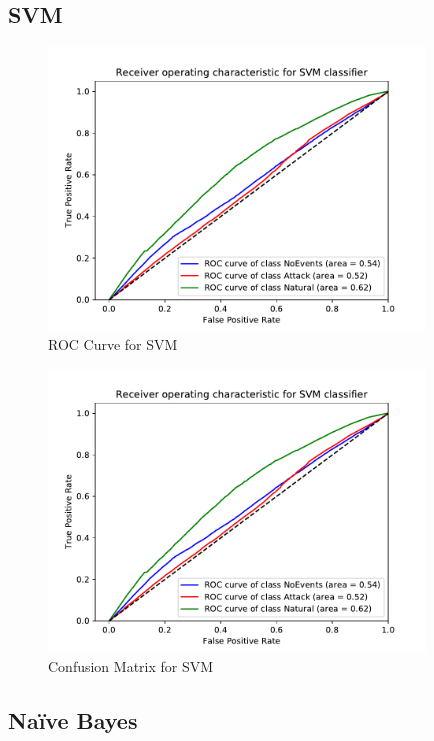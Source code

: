 \subsection{SVM}

\begin{figure}[H]
    \centering
    \includegraphics[page=1, width=100mm]{images/results_scikit/SVM}
    \caption{ROC Curve for SVM}
    \label{fig_scikit_SVM_ROC}
\end{figure}

\begin{figure}[H]
    \centering
    \includegraphics[page=2, width=100mm, trim= 0 50 0 100, clip]{images/results_scikit/SVM}
    \caption{Confusion Matrix for SVM}
    \label{fig_scikit_SVM_ROC}
\end{figure}

\subsection{Naïve Bayes}

